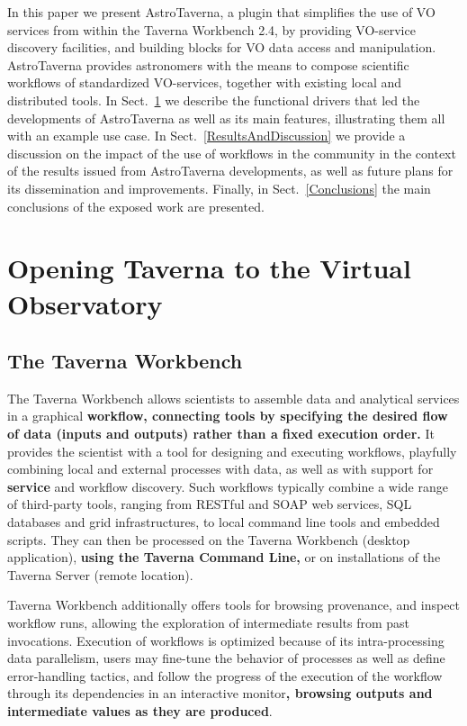 \documentclass{aa}
\begin{document}
In this paper we present AstroTaverna, a plugin that simplifies the use of VO services from within the Taverna Workbench 2.4, by providing VO-service discovery facilities, and building blocks for VO data access and manipulation. AstroTaverna provides astronomers with the means to compose scientific workflows of standardized VO-services, together with existing local and distributed tools. In Sect.~\ref{Materials} we describe the functional drivers that led the developments of AstroTaverna as well as its main features, illustrating them all with an example use case. In Sect.~\ref{ResultsAndDiscussion} we provide a discussion on the impact of the use of workflows in the community in the context of the results issued from AstroTaverna developments, as well as future plans for its dissemination and improvements. Finally, in Sect.~\ref{Conclusions} the main conclusions of the exposed work are presented. 


\section{Opening Taverna to the Virtual Observatory}
\label{Materials}

\subsection{The Taverna Workbench}
\label{TavernaWorkbench}

The Taverna Workbench allows scientists to assemble data and analytical services in a graphical \textbf{workflow, connecting tools by specifying the desired flow of data (inputs and outputs) rather than a fixed execution order.} It provides the scientist with a tool for designing and executing workflows, playfully combining local and external processes with data, as well as with support for \textbf{service} and workflow discovery. Such workflows typically combine a wide range of third-party tools, ranging from RESTful and SOAP web services, SQL databases and grid infrastructures, to local command line tools and embedded scripts. They can then be processed on the Taverna Workbench (desktop application), \textbf{using the Taverna Command Line,} or on installations of the Taverna Server (remote location).

Taverna Workbench additionally offers tools for browsing provenance, and inspect workflow runs, allowing the exploration of intermediate results from past invocations. Execution of workflows is optimized because of its intra-processing data parallelism, users may fine-tune the behavior of processes as well as define error-handling tactics, and follow the progress of the execution of the workflow through its dependencies in an interactive monitor\textbf{, browsing outputs and intermediate values as they are produced}.
\end{document}
